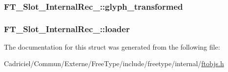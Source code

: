 \hypertarget{struct_f_t___slot___internal_rec___ac2bba891ac70016b74c085a05c1f182c}{
\subsubsection[{glyph\-\_\-transformed}]{ F\-T\-\_\-\-Slot\-\_\-\-Internal\-Rec\-\_\-\-::glyph\-\_\-transformed}}\label{struct_f_t___slot___internal_rec___ac2bba891ac70016b74c085a05c1f182c}
\hypertarget{struct_f_t___slot___internal_rec___ac57f8c939f667938ab9f986088c15d8f}{
\subsubsection[{loader}]{ F\-T\-\_\-\-Slot\-\_\-\-Internal\-Rec\-\_\-\-::loader}}\label{struct_f_t___slot___internal_rec___ac57f8c939f667938ab9f986088c15d8f}


The documentation for this struct was generated from the following file\-:\begin{DoxyCompactItemize}
\item 
Cadriciel/\-Commun/\-Externe/\-Free\-Type/include/freetype/internal/\hyperlink{ftobjs_8h}{ftobjs.\-h}\end{DoxyCompactItemize}
